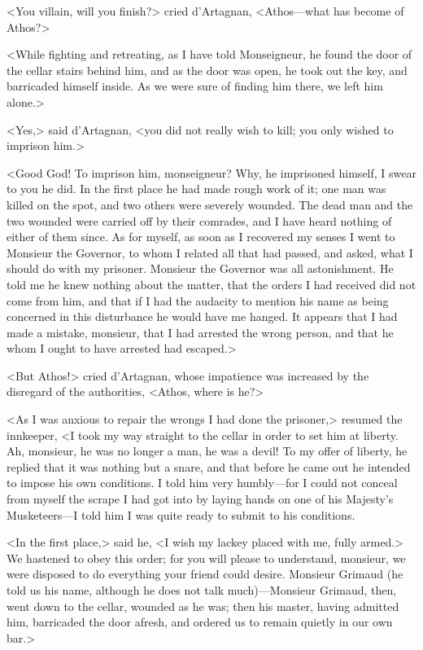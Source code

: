 <You villain, will you finish?> cried d'Artagnan, <Athos---what has become of Athos?> 

<While fighting and retreating, as I have told Monseigneur, he found the door of the cellar stairs behind him, and as the door was open, he took out the key, and barricaded himself inside. As we were sure of finding him there, we left him alone.> 

<Yes,> said d'Artagnan, <you did not really wish to kill; you only wished to imprison him.> 

<Good God! To imprison him, monseigneur? Why, he imprisoned himself, I swear to you he did. In the first place he had made rough work of it; one man was killed on the spot, and two others were severely wounded. The dead man and the two wounded were carried off by their comrades, and I have heard nothing of either of them since. As for myself, as soon as I recovered my senses I went to Monsieur the Governor, to whom I related all that had passed, and asked, what I should do with my prisoner. Monsieur the Governor was all astonishment. He told me he knew nothing about the matter, that the orders I had received did not come from him, and that if I had the audacity to mention his name as being concerned in this disturbance he would have me hanged. It appears that I had made a mistake, monsieur, that I had arrested the wrong person, and that he whom I ought to have arrested had escaped.> 

<But Athos!> cried d'Artagnan, whose impatience was increased by the disregard of the authorities, <Athos, where is he?> 

<As I was anxious to repair the wrongs I had done the prisoner,> resumed the innkeeper, <I took my way straight to the cellar in order to set him at liberty. Ah, monsieur, he was no longer a man, he was a devil! To my offer of liberty, he replied that it was nothing but a snare, and that before he came out he intended to impose his own conditions. I told him very humbly---for I could not conceal from myself the scrape I had got into by laying hands on one of his Majesty's Musketeers---I told him I was quite ready to submit to his conditions. 

<In the first place,> said he, <I wish my lackey placed with me, fully armed.> We hastened to obey this order; for you will please to understand, monsieur, we were disposed to do everything your friend could desire. Monsieur Grimaud (he told us his name, although he does not talk much)---Monsieur Grimaud, then, went down to the cellar, wounded as he was; then his master, having admitted him, barricaded the door afresh, and ordered us to remain quietly in our own bar.> 


